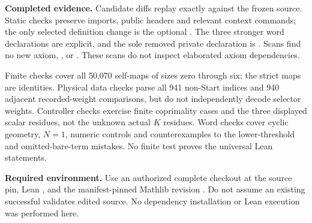 \textbf{Completed evidence.} Candidate diffs replay exactly against the frozen source. Static checks preserve imports, public headers and relevant context commands; the only selected definition change is the optional . The three stronger word declarations are explicit, and the sole removed private declaration is . Scans find no new axiom, ,  or . These scans do not inspect elaborated axiom dependencies.

Finite checks cover all 50,070 self-maps of sizes zero through six; the strict maps are identities. Physical data checks parse all 941 non-Start indices and 940 adjacent recorded-weight comparisons, but do not independently decode selector weights. Controller checks exercise finite coprimality cases and the three displayed scalar residues, not the unknown actual \(K\) residues. Word checks cover cyclic geometry, \(N=1\), numeric controls and counterexamples to the lower-threshold and omitted-bare-term mistakes. No finite test proves the universal Lean statements.

\textbf{Required environment.} Use an authorized complete checkout at the source pin, Lean , and the manifest-pinned Mathlib revision . Do not assume an existing successful  validates edited source. No dependency installation or Lean execution was performed here.

